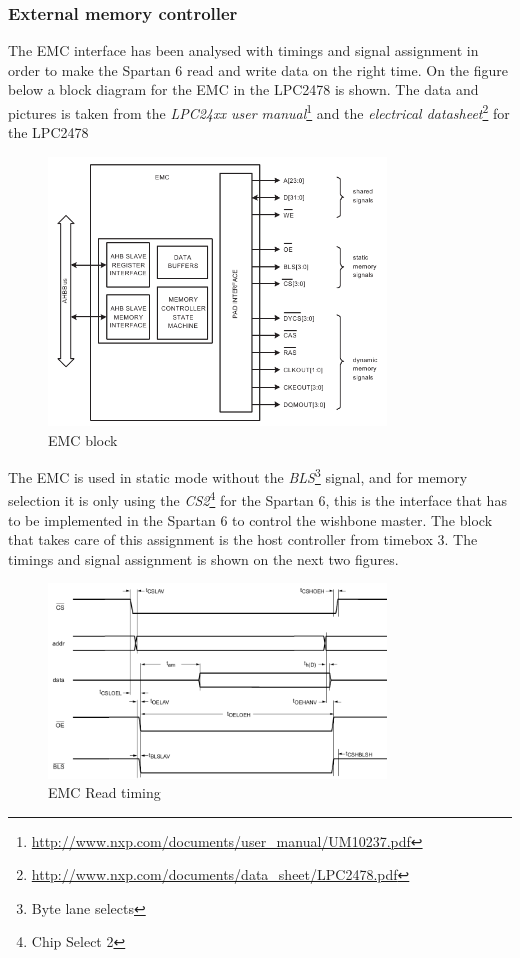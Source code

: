 \subsubsection{External memory controller}
The EMC interface has been analysed with timings and signal assignment in order to make the Spartan 6 read and write data on the right time. On the figure below a block diagram for the EMC in the LPC2478 is shown. The data and pictures is taken from the \textit{LPC24xx user manual}\footnote{\url{http://www.nxp.com/documents/user\_manual/UM10237.pdf}} and the \textit{electrical datasheet}\footnote{\url{http://www.nxp.com/documents/data\_sheet/LPC2478.pdf}} for the LPC2478
\begin{figure}[H]
	\begin{centering}
		\includegraphics[width=0.8\textwidth]{images/tb7_EMC_block.png}
		\caption{EMC block}
	\end{centering}
\end{figure}
The EMC is used in static mode without the \textit{BLS}\footnote{Byte lane selects} signal, and for memory selection it is only using the \textit{CS2}\footnote{Chip Select 2} for the Spartan 6, this is the interface that has to be implemented in the Spartan 6 to control the wishbone master. The block that takes care of this assignment is the host controller from timebox 3. The timings and signal assignment is shown on the next two figures.
\begin{figure}[H]
	\begin{centering}
		\includegraphics[width=0.8\textwidth]{images/tb7_EMC_read.png}
		\caption{EMC Read timing}
	\end{centering}
\end{figure}
